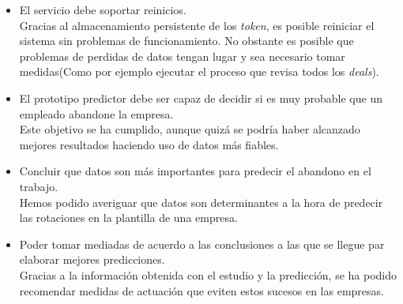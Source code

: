 \begin{itemize}
	\item El servicio debe soportar reinicios.\\
	
	Gracias al almacenamiento persistente de los \textit{token}, es posible reiniciar el sistema sin problemas de funcionamiento. No obstante es posible que problemas de perdidas de datos tengan lugar y sea necesario tomar medidas(Como por ejemplo ejecutar el proceso que revisa todos los \textit{deals}).
	\item El prototipo predictor debe ser capaz de decidir si es muy probable que un empleado abandone la empresa.\\
	
	Este objetivo se ha cumplido, aunque quizá se podría haber alcanzado mejores resultados haciendo uso de datos más fiables.
	\item Concluir que datos son más importantes para predecir el abandono en el trabajo.\\
	
	Hemos podido averiguar que datos son determinantes a la hora de predecir las rotaciones en la plantilla de una empresa.
	\item Poder tomar mediadas de acuerdo a las conclusiones a las que se llegue par elaborar mejores predicciones.\\
	
	Gracias a la información obtenida con el estudio y la predicción, se ha podido recomendar medidas de actuación que eviten estos sucesos en las empresas.
\end{itemize}




